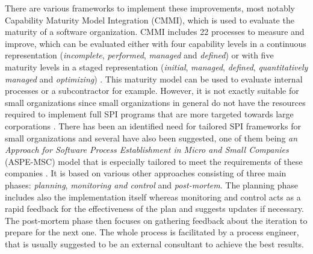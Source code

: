There are various frameworks to implement these improvements, most notably Capability Maturity Model Integration (CMMI),
which is used to evaluate the maturity of a software organization. CMMI includes 22 processes to measure and improve, which can be evaluated either with four capability levels
in a continuous representation (\emph{incomplete}, \emph{performed}, \emph{managed} and \emph{defined}) or with five maturity levels in a staged representation (\emph{initial}, \emph{managed},
\emph{defined}, \emph{quantitatively managed} and \emph{optimizing}) \citep{CMMIProductTeam2010}. This maturity model can be used to evaluate internal processes or a subcontractor for example.
However, it is not exactly suitable for small organizations since small organizations in general do not have the resources required to implement full SPI programs that are more targeted towards
large corporations \citep{Mishra2009b}. There has been an identified need for tailored SPI frameworks for small organizations and several have also been suggested, one of them being \emph{an Approach
for Software Process Establishment in Micro and Small Companies} (ASPE-MSC) model that is especially tailored to meet the requirements of these companies \citep{Mishra2009b}. It is based on
various other approaches consisting of three main phases: \emph{planning}, \emph{monitoring and control} and \emph{post-mortem}. The planning phase includes also the implementation itself whereas
monitoring and control acts as a rapid feedback for the effectiveness of the plan and suggests updates if necessary. The post-mortem phase then focuses on gathering feedback about the iteration to
prepare for the next one. The whole process is facilitated by a process engineer, that is usually suggested to be an external consultant to achieve the best results.

